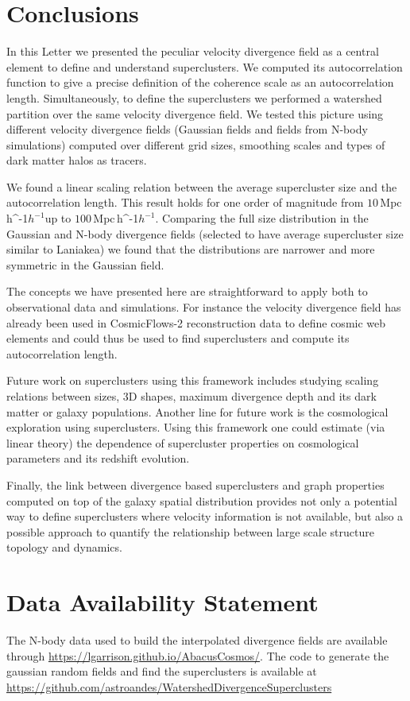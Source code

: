 \documentclass[usenatbib]{mnras}
\newcommand{\Mpch}{\,{\rm Mpc}\,\ifmmode h^{-1}\else $h^{-1}$\fi}
\begin{document}
\section{Conclusions}
\label{sec:conclusion}


In this Letter we presented the peculiar velocity divergence field as a central element to define and understand superclusters.
We computed its autocorrelation function to give a precise definition of the coherence scale as an autocorrelation length. 
Simultaneously, to define the superclusters we performed a watershed partition over the same velocity divergence field. 
We tested this picture using different velocity divergence fields (Gaussian fields and fields from N-body simulations) computed over different grid sizes, smoothing scales and types of dark matter halos as tracers.

We found a linear scaling relation between the average supercluster size and the autocorrelation length. 
This result holds for one order of magnitude from $10$\Mpch up to $100$\Mpch.
Comparing the full size distribution in the Gaussian and N-body divergence fields (selected to have average supercluster size similar to Laniakea) we found that the distributions are narrower and more symmetric in the Gaussian field.

The concepts we have presented here are straightforward to apply both to observational data and simulations.
For instance the velocity divergence field has already been used in CosmicFlows-2 reconstruction data to define cosmic web elements \citep{2015MNRAS.452.1052L} and could thus be used to find superclusters and compute its autocorrelation length.

Future work on superclusters using this framework includes studying scaling relations between sizes, 3D shapes, maximum divergence depth and its dark matter or galaxy populations.
Another line for future work is the cosmological exploration using superclusters.
Using this framework one could estimate (via linear theory) the dependence of supercluster properties on cosmological parameters and its redshift evolution.

Finally, the link between divergence based superclusters and graph properties \citep{2020MNRAS.tmpL.153G} computed on top of the galaxy spatial distribution provides not only a potential way to define superclusters where velocity information is not available, but also a possible approach to quantify the relationship between large scale structure topology and dynamics.


\section*{Data Availability Statement}
The N-body data used to build the interpolated divergence fields are available through \url{https://lgarrison.github.io/AbacusCosmos/}. 
The code to generate the gaussian random fields and find the superclusters is available at \url{https://github.com/astroandes/WatershedDivergenceSuperclusters}



\end{document}
